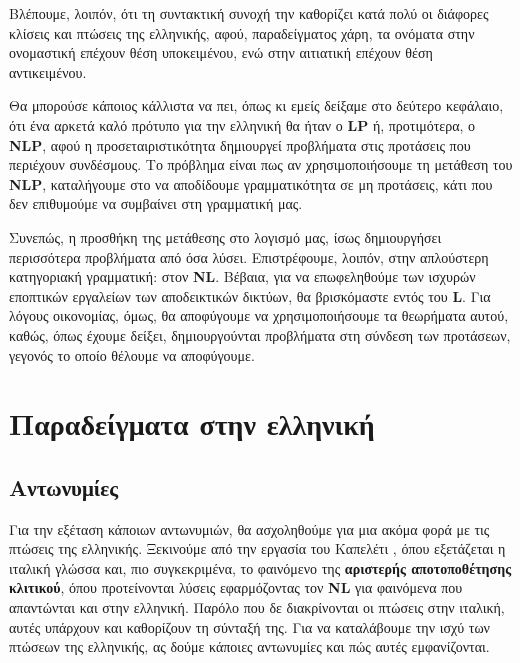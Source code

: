 \documentclass [a4paper,11pt] {book}
\theoremstyle{definition}
\theoremstyle{definition}
\begin{document}
Βλέπουμε, λοιπόν, ότι τη συντακτική συνοχή την καθορίζει κατά πολύ οι διάφορες κλίσεις και πτώσεις της ελληνικής, αφού, παραδείγματος χάρη, τα ονόματα στην ονομαστική επέχουν θέση υποκειμένου, ενώ στην αιτιατική επέχουν θέση αντικειμένου.

Θα μπορούσε κάποιος κάλλιστα να πει, όπως κι εμείς δείξαμε στο δεύτερο κεφάλαιο, ότι ένα αρκετά καλό πρότυπο για την ελληνική θα ήταν ο \textbf{LP} ή, προτιμότερα, ο \textbf{NLP}, αφού η προσεταιριστικότητα δημιουργεί προβλήματα στις προτάσεις που περιέχουν συνδέσμους. Το πρόβλημα είναι πως αν χρησιμοποιήσουμε τη μετάθεση του \textbf{NLP}, καταλήγουμε στο να αποδίδουμε γραμματικότητα σε μη προτάσεις, κάτι που δεν επιθυμούμε να συμβαίνει στη γραμματική μας.

Συνεπώς, η προσθήκη της μετάθεσης στο λογισμό μας, ίσως δημιουργήσει περισσότερα προβλήματα από όσα λύσει. Επιστρέφουμε, λοιπόν, στην απλούστερη κατηγοριακή γραμματική: στον \textbf{NL}. Βέβαια, για να επωφεληθούμε των ισχυρών εποπτικών εργαλείων των αποδεικτικών δικτύων, θα βρισκόμαστε εντός του \textbf{L}. Για λόγους οικονομίας, όμως, θα αποφύγουμε να χρησιμοποιήσουμε τα θεωρήματα αυτού, καθώς, όπως έχουμε δείξει, δημιουργούνται προβλήματα στη σύνδεση των προτάσεων, γεγονός το οποίο θέλουμε να αποφύγουμε.

\section{Παραδείγματα στην ελληνική}
\subsection{Αντωνυμίες}
Για την εξέταση κάποιων αντωνυμιών, θα ασχοληθούμε για μια ακόμα φορά με τις πτώσεις της ελληνικής. Ξεκινούμε από την εργασία του Καπελέτι \citep{capelleti07}, όπου εξετάζεται η ιταλική γλώσσα και, πιο συγκεκριμένα, το φαινόμενο της \textbf{αριστερής αποτοποθέτησης κλιτικού}, όπου προτείνονται λύσεις εφαρμόζοντας τον \textbf{NL} για φαινόμενα που απαντώνται και στην ελληνική. Παρόλο που δε διακρίνονται οι πτώσεις στην ιταλική, αυτές υπάρχουν και καθορίζουν τη σύνταξή της. Για να καταλάβουμε την ισχύ των πτώσεων της ελληνικής, ας δούμε κάποιες αντωνυμίες και πώς αυτές εμφανίζονται.
\end{document}
